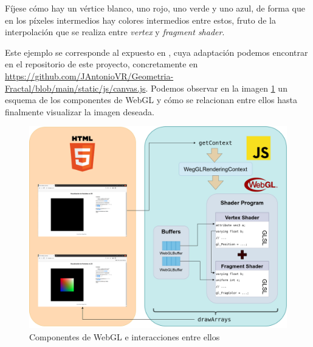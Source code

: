 Fíjese cómo hay un vértice blanco, uno rojo, uno verde y uno azul, de forma que en los píxeles intermedios hay colores intermedios entre estos, fruto de la interpolación que se realiza entre \textit{vertex} y \textit{fragment shader}.

Este ejemplo se corresponde al expuesto en \cite{MDN-1}, cuya adaptación podemos encontrar en el repositorio de este proyecto, concretamente en \url{https://github.com/JAntonioVR/Geometria-Fractal/blob/main/static/js/canvas.js}. Podemos observar en la imagen \ref{fig:componentes-wgl} un esquema de los componentes de WebGL y cómo se relacionan entre ellos hasta finalmente visualizar la imagen deseada.  %

\newpage

\begin{figure} [ht]
    \centering
    \includegraphics[scale = 0.35]{img/C5/WEBGL-workflow.drawio.png}
    \caption{Componentes de WebGL e interacciones entre ellos}
    \label{fig:componentes-wgl}
\end{figure}


